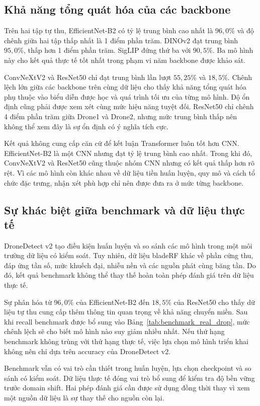 \documentclass[../DoAn.tex]{subfiles}
\begin{document}
\subsection{Khả năng tổng quát hóa của các backbone}

Trên hai tập tự thu, EfficientNet-B2 có tỷ lệ trung bình cao nhất là $96,0\%$ và độ chênh giữa hai tập thấp nhất là 1 điểm phần trăm. DINOv2 đạt trung bình $95,0\%$, thấp hơn 1 điểm phần trăm. SigLIP đứng thứ ba với $90,5\%$. Ba mô hình này cho kết quả thực tế tốt nhất trong phạm vi năm backbone được khảo sát.

ConvNeXtV2 và ResNet50 chỉ đạt trung bình lần lượt $55,25\%$ và $18,5\%$. Chênh lệch lớn giữa các backbone trên cùng dữ liệu cho thấy khả năng tổng quát hóa phụ thuộc vào biểu diễn được học và quá trình tối ưu của từng mô hình. Độ ổn định cũng phải được xem xét cùng mức hiệu năng tuyệt đối. ResNet50 chỉ chênh 4 điểm phần trăm giữa Drone1 và Drone2, nhưng mức trung bình thấp nên không thể xem đây là sự ổn định có ý nghĩa tích cực.

Kết quả không cung cấp căn cứ để kết luận Transformer luôn tốt hơn CNN. EfficientNet-B2 là một CNN nhưng đạt tỷ lệ trung bình cao nhất. Trong khi đó, ConvNeXtV2 và ResNet50 cũng thuộc nhóm CNN nhưng có kết quả thấp hơn rõ rệt. Vì các mô hình còn khác nhau về dữ liệu tiền huấn luyện, quy mô và cách tổ chức đặc trưng, nhận xét phù hợp chỉ nên được đưa ra ở mức từng backbone.

\subsection{Sự khác biệt giữa benchmark và dữ liệu thực tế}

DroneDetect v2 tạo điều kiện huấn luyện và so sánh các mô hình trong một môi trường dữ liệu có kiểm soát. Tuy nhiên, dữ liệu bladeRF khác về phần cứng thu, đáp ứng tần số, mức khuếch đại, nhiễu nền và các nguồn phát cùng băng tần. Do đó, kết quả benchmark không thể thay thế hoàn toàn phép đánh giá trên dữ liệu thực tế.

Sự phân hóa từ $96,0\%$ của EfficientNet-B2 đến $18,5\%$ của ResNet50 cho thấy dữ liệu tự thu cung cấp thêm thông tin quan trọng về khả năng chuyển miền. Sau khi recall benchmark được bổ sung vào Bảng~\ref{tab:benchmark_real_drop}, mức chênh lệch sẽ cho biết mô hình nào suy giảm nhiều nhất. Nếu thứ hạng benchmark không trùng với thứ hạng thực tế, việc lựa chọn mô hình triển khai không nên chỉ dựa trên accuracy của DroneDetect v2.

Benchmark vẫn có vai trò cần thiết trong huấn luyện, lựa chọn checkpoint và so sánh có kiểm soát. Dữ liệu thực tế đóng vai trò bổ sung để kiểm tra độ bền vững trước domain shift. Hai phép đánh giá cần được sử dụng đồng thời thay vì xem một nguồn dữ liệu là sự thay thế cho nguồn còn lại.
\end{document}
